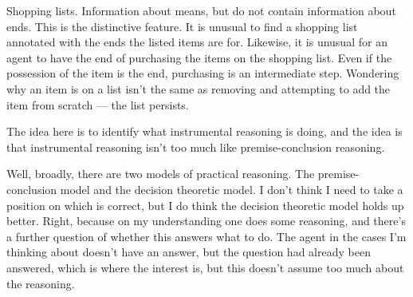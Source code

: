 \documentclass[10pt]{article}
\newcommand{\hozlinedash}[0]{%
  \noindent\hdashrule[0.5ex][c]{\textwidth}{.1pt}{2.5pt}
}
\begin{document}
Shopping lists.
Information about means, but do not contain information about ends.
This is the distinctive feature.
It is unusual to find a shopping list annotated with the ends the listed items are for.
Likewise, it is unusual for an agent to have the end of purchasing the items on the shopping list.
Even if the possession of the item is the end, purchasing is an intermediate step.
Wondering why an item is on a list isn't the same as removing and attempting to add the item from scratch --- the list persists.

\hozlinedash

\begin{wodge}
  The idea here is to identify what instrumental reasoning is doing, and the idea is that instrumental reasoning isn't too much like premise-conclusion reasoning.

  Well, broadly, there are two models of practical reasoning.
  The premise-conclusion model and the decision theoretic model.
  I don't think I need to take a position on which is correct, but I do think the decision theoretic model holds up better.
  Right, because on my understanding one does some reasoning, and there's a further question of whether this answers what to do.
  The agent in the cases I'm thinking about doesn't have an answer, but the question had already been answered, which is where the interest is, but this doesn't assume too much about the reasoning.
\end{wodge}
\end{document}

